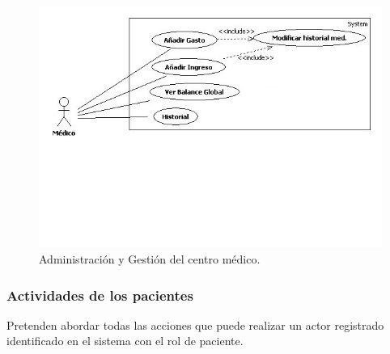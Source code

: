 				\begin{figure}[H]
				  \centering
				    \includegraphics[width=14cm]{img/jpg/casos_uso/Administracion_y_Gestion.jpg}
				  \caption{Administración y Gestión del centro médico.}
				  \label{fig:ad_ges_med}
				\end{figure}
					
	
		\subsubsection{Actividades de los pacientes} %
		\label{sec:actividades_de_los_pacientes}
		Pretenden abordar todas las acciones que puede realizar un actor registrado identificado en el sistema con el rol de paciente.

